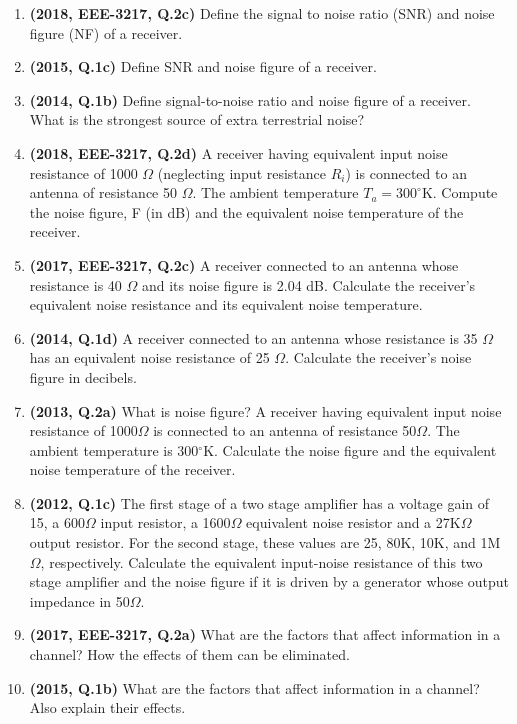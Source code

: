 \documentclass[12pt, a4paper]{article}
\begin{document}
\begin{enumerate}
		\item \textbf{(2018, EEE-3217, Q.2c)} Define the signal to noise ratio (SNR) and noise figure (NF) of a receiver.
		\item \textbf{(2015, Q.1c)} Define SNR and noise figure of a receiver.
		\item \textbf{(2014, Q.1b)} Define signal-to-noise ratio and noise figure of a receiver. What is the strongest source of extra terrestrial noise?
		
		\item \textbf{(2018, EEE-3217, Q.2d)} A receiver having equivalent input noise resistance of 1000 $\Omega$ (neglecting input resistance $R_i$) is connected to an antenna of resistance 50 $\Omega$. The ambient temperature $T_a = 300^{\circ}$K. Compute the noise figure, F (in dB) and the equivalent noise temperature of the receiver.
		\item \textbf{(2017, EEE-3217, Q.2c)} A receiver connected to an antenna whose resistance is 40 $\Omega$ and its noise figure is 2.04 dB. Calculate the receiver's equivalent noise resistance and its equivalent noise temperature.
		\item \textbf{(2014, Q.1d)} A receiver connected to an antenna whose resistance is 35 $\Omega$ has an equivalent noise resistance of 25 $\Omega$. Calculate the receiver's noise figure in decibels.
		\item \textbf{(2013, Q.2a)} What is noise figure? A receiver having equivalent input noise resistance of 1000$\Omega$ is connected to an antenna of resistance 50$\Omega$. The ambient temperature is 300$^{\circ}$K. Calculate the noise figure and the equivalent noise temperature of the receiver.
		\item \textbf{(2012, Q.1c)} The first stage of a two stage amplifier has a voltage gain of 15, a 600$\Omega$ input resistor, a 1600$\Omega$ equivalent noise resistor and a 27K$\Omega$ output resistor. For the second stage, these values are 25, 80K, 10K, and 1M$\Omega$, respectively. Calculate the equivalent input-noise resistance of this two stage amplifier and the noise figure if it is driven by a generator whose output impedance in 50$\Omega$.
		
		\item \textbf{(2017, EEE-3217, Q.2a)} What are the factors that affect information in a channel? How the effects of them can be eliminated.
		\item \textbf{(2015, Q.1b)} What are the factors that affect information in a channel? Also explain their effects.
		

\end{enumerate}
\end{document}
